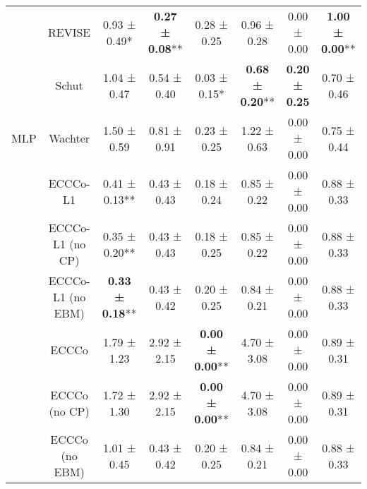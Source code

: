 \begin{table}
{\begin{tabular}[t]{cccccccc}
 & REVISE & 0.93 ± 0.49*\hphantom{*} & \textbf{0.27 ± 0.08}** & 0.28 ± 0.25\hphantom{*}\hphantom{*} & 0.96 ± 0.28\hphantom{*}\hphantom{*} & 0.00 ± 0.00\hphantom{*}\hphantom{*} & \textbf{1.00 ± 0.00}**\\

 & Schut & 1.04 ± 0.47\hphantom{*}\hphantom{*} & 0.54 ± 0.40\hphantom{*}\hphantom{*} & 0.03 ± 0.15*\hphantom{*} & \textbf{0.68 ± 0.20}** & \textbf{0.20 ± 0.25}\hphantom{*}\hphantom{*} & 0.70 ± 0.46\hphantom{*}\hphantom{*}\\

\multirow[t]{-9}{*}{\centering\arraybackslash MLP} & Wachter & 1.50 ± 0.59\hphantom{*}\hphantom{*} & 0.81 ± 0.91\hphantom{*}\hphantom{*} & 0.23 ± 0.25\hphantom{*}\hphantom{*} & 1.22 ± 0.63\hphantom{*}\hphantom{*} & 0.00 ± 0.00\hphantom{*}\hphantom{*} & 0.75 ± 0.44\hphantom{*}\hphantom{*}\\
\cmidrule{1-8}
 & ECCCo-L1 & 0.41 ± 0.13** & 0.43 ± 0.43\hphantom{*}\hphantom{*} & 0.18 ± 0.24\hphantom{*}\hphantom{*} & 0.85 ± 0.22\hphantom{*}\hphantom{*} & 0.00 ± 0.00\hphantom{*}\hphantom{*} & 0.88 ± 0.33\hphantom{*}\hphantom{*}\\

 & ECCCo-L1 (no CP) & 0.35 ± 0.20** & 0.43 ± 0.43\hphantom{*}\hphantom{*} & 0.18 ± 0.25\hphantom{*}\hphantom{*} & 0.85 ± 0.22\hphantom{*}\hphantom{*} & 0.00 ± 0.00\hphantom{*}\hphantom{*} & 0.88 ± 0.33\hphantom{*}\hphantom{*}\\

 & ECCCo-L1 (no EBM) & \textbf{0.33 ± 0.18}** & 0.43 ± 0.42\hphantom{*}\hphantom{*} & 0.20 ± 0.25\hphantom{*}\hphantom{*} & 0.84 ± 0.21\hphantom{*}\hphantom{*} & 0.00 ± 0.00\hphantom{*}\hphantom{*} & 0.88 ± 0.33\hphantom{*}\hphantom{*}\\

 & ECCCo & 1.79 ± 1.23\hphantom{*}\hphantom{*} & 2.92 ± 2.15\hphantom{*}\hphantom{*} & \textbf{0.00 ± 0.00}** & 4.70 ± 3.08\hphantom{*}\hphantom{*} & 0.00 ± 0.00\hphantom{*}\hphantom{*} & 0.89 ± 0.31\hphantom{*}\hphantom{*}\\

 & ECCCo (no CP) & 1.72 ± 1.30\hphantom{*}\hphantom{*} & 2.92 ± 2.15\hphantom{*}\hphantom{*} & \textbf{0.00 ± 0.00}** & 4.70 ± 3.08\hphantom{*}\hphantom{*} & 0.00 ± 0.00\hphantom{*}\hphantom{*} & 0.89 ± 0.31\hphantom{*}\hphantom{*}\\

 & ECCCo (no EBM) & 1.01 ± 0.45\hphantom{*}\hphantom{*} & 0.43 ± 0.42\hphantom{*}\hphantom{*} & 0.20 ± 0.25\hphantom{*}\hphantom{*} & 0.84 ± 0.21\hphantom{*}\hphantom{*} & 0.00 ± 0.00\hphantom{*}\hphantom{*} & 0.88 ± 0.33\hphantom{*}\hphantom{*}\\


\end{tabular}}
\end{table}
